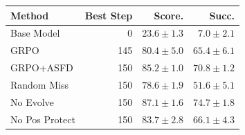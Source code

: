 \begin{tabular}{lrrr}
\toprule
Method & Best Step & Score. & Succ. \\
\midrule
Base Model & 0 & $23.6 \pm 1.3$ & $7.0 \pm 2.1$ \\
GRPO & 145 & $80.4 \pm 5.0$ & $65.4 \pm 6.1$ \\
GRPO+ASFD & 150 & $85.2 \pm 1.0$ & $70.8 \pm 1.2$ \\
Random Miss & 150 & $78.6 \pm 1.9$ & $51.6 \pm 5.1$ \\
No Evolve & 150 & $87.1 \pm 1.6$ & $74.7 \pm 1.8$ \\
No Pos Protect & 150 & $83.7 \pm 2.8$ & $66.1 \pm 4.3$ \\
\bottomrule
\end{tabular}
